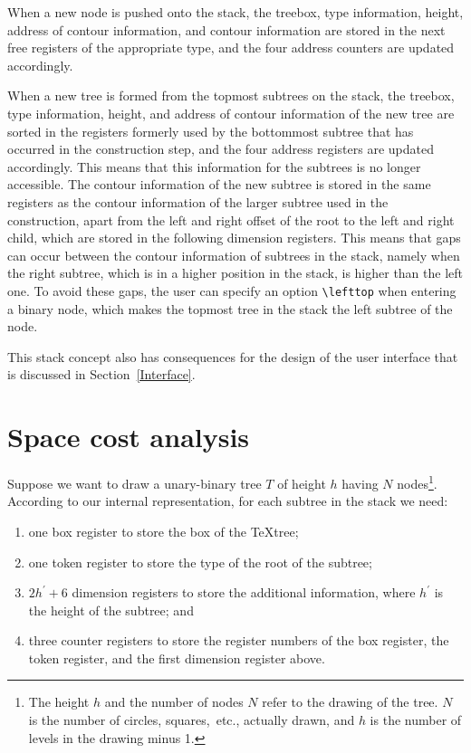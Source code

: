 When a new node is pushed onto the stack, the treebox, type information,
height, address of contour information, and contour information are
stored in the next free registers of the appropriate type, and the
four address counters are updated accordingly.

When a new tree is formed from the topmost subtrees on the stack,
the treebox, type information, height, and address of contour information
of the new tree are sorted in the registers formerly used by the bottommost
subtree that has occurred in the construction step, 
and the four address registers are
updated accordingly. This means that this information for the subtrees
is no longer accessible. The contour information of the new subtree
is stored in the same registers as the contour information of the larger
subtree used in the construction, apart from the left and right offset
of the root to the left and right child, which are stored in the
following dimension registers. This means that gaps can occur
between the contour information of subtrees in the
stack, namely when the right subtree, which is in a higher position in the
stack, is higher than the left one. To avoid these
gaps, the user can specify an option \verb.\lefttop. when entering a
binary node, which makes the topmost tree in the stack the
left subtree of the node.

This stack concept also has consequences for the design of the user interface
that is discussed in Section~\ref{Interface}.

\section{Space cost analysis}

Suppose we want to draw a unary-binary tree $T$ of height $h$ having
$N$ nodes\footnote{The height $h$ and the number of nodes $N$ refer to the
drawing of the tree. $N$ is the number of circles, squares,~etc., actually
drawn, and $h$ is the number of levels in the drawing minus 1.}.
According to our internal representation,
for each subtree in the stack we need:

\begin{enumerate}
\item one box register to store the box of the \TeX{}tree;
\item one token register to store the type of the root of the subtree;
\item $2h^\prime+6$ dimension registers to store the additional
      information, where $h^\prime$ is the height of the
      subtree; and
\item three counter registers to store the register numbers of the
      box register, the token register, and the first dimension register above.
\end{enumerate}

